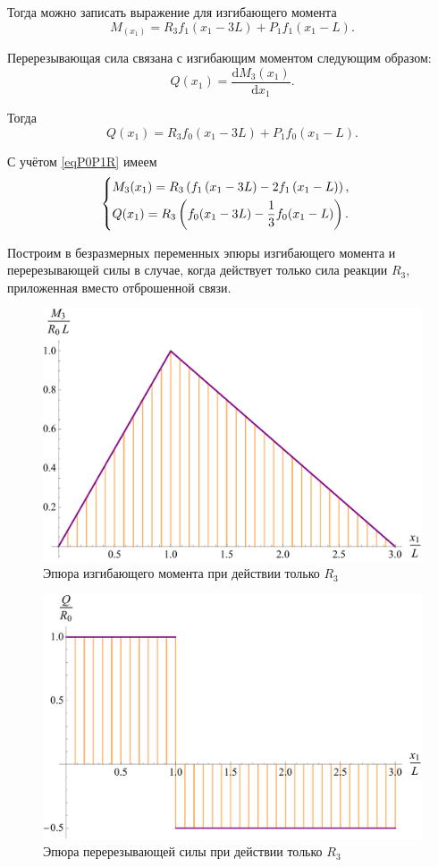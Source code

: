 \documentclass[12pt, a4paper]{article}
\begin{document}
	Тогда можно записать выражение для изгибающего момента
	\[
	M_(x_1) = R_3 f_1(x_1 - 3L) + P_1 f_1(x_1 - L).
	\]
	
	Перерезывающая сила связана с изгибающим моментом следующим образом:
	\begin{equation}
		Q(x_1) = \dfrac{\mathrm{d} M_3(x_1)}{\mathrm{d} x_1}.
		\label{eqQ}
	\end{equation}
	
	Тогда
	\[
	Q(x_1) = R_3 f_0(x_1 - 3L) + P_1 f_0(x_1 - L).
	\]
	
	С учётом \eqref{eqP0P1R} имеем
	\begin{equation}
		\begin{cases} \vspace{0.25em}
			M_3(x_1) = R_3 \left( f_1\left(x_1 - 3L\right) - 2 f_1\left(x_1 - L\right) \right), \\
			Q(x_1) = R_3 \left( f_0(x_1 - 3L) - \dfrac{1}{3} f_0(x_1 - L) \right). \\
		\end{cases}
		\label{eqM3QR}
	\end{equation}
	
	Построим в безразмерных переменных эпюры изгибающего момента и перерезывающей силы в случае, когда действует только сила реакции $R_3$, приложенная вместо отброшенной связи.
	
	\begin{figure}[!h]
		\centering
		\includegraphics[width=0.75\linewidth]{plot-5}
		\caption{Эпюра изгибающего момента при действии только $R_3$}
	\end{figure} 
	
	\newpage
	
	\begin{figure}[!h]
		\centering
		\includegraphics[width=0.75\linewidth]{plot-6}
		\caption{Эпюра перерезывающей силы при действии только $R_3$}
	\end{figure}
	
\end{document}
